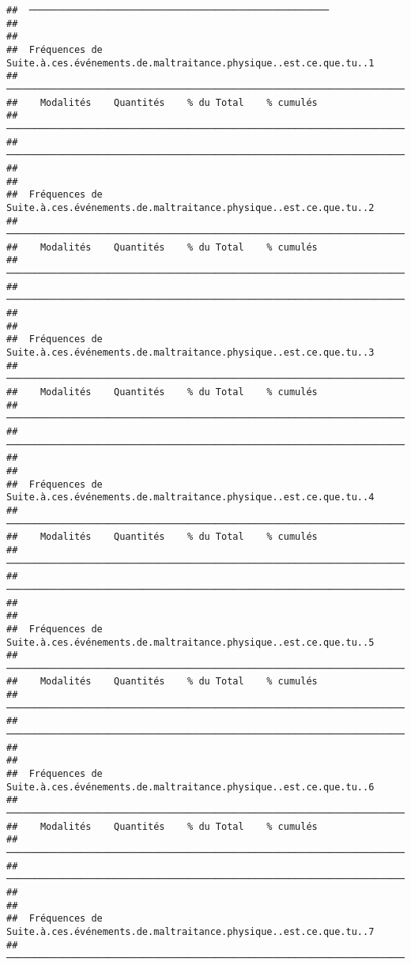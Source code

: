 \documentclass[
]{article}
\begin{document}
\begin{verbatim}
##  ───────────────────────────────────────────────────── 
## 
## 
##  Fréquences de Suite.à.ces.événements.de.maltraitance.physique..est.ce.que.tu..1 
##  ─────────────────────────────────────────────────────────────────────────────── 
##    Modalités    Quantités    % du Total    % cumulés   
##  ─────────────────────────────────────────────────────────────────────────────── 
##  ─────────────────────────────────────────────────────────────────────────────── 
## 
## 
##  Fréquences de Suite.à.ces.événements.de.maltraitance.physique..est.ce.que.tu..2 
##  ─────────────────────────────────────────────────────────────────────────────── 
##    Modalités    Quantités    % du Total    % cumulés   
##  ─────────────────────────────────────────────────────────────────────────────── 
##  ─────────────────────────────────────────────────────────────────────────────── 
## 
## 
##  Fréquences de Suite.à.ces.événements.de.maltraitance.physique..est.ce.que.tu..3 
##  ─────────────────────────────────────────────────────────────────────────────── 
##    Modalités    Quantités    % du Total    % cumulés   
##  ─────────────────────────────────────────────────────────────────────────────── 
##  ─────────────────────────────────────────────────────────────────────────────── 
## 
## 
##  Fréquences de Suite.à.ces.événements.de.maltraitance.physique..est.ce.que.tu..4 
##  ─────────────────────────────────────────────────────────────────────────────── 
##    Modalités    Quantités    % du Total    % cumulés   
##  ─────────────────────────────────────────────────────────────────────────────── 
##  ─────────────────────────────────────────────────────────────────────────────── 
## 
## 
##  Fréquences de Suite.à.ces.événements.de.maltraitance.physique..est.ce.que.tu..5 
##  ─────────────────────────────────────────────────────────────────────────────── 
##    Modalités    Quantités    % du Total    % cumulés   
##  ─────────────────────────────────────────────────────────────────────────────── 
##  ─────────────────────────────────────────────────────────────────────────────── 
## 
## 
##  Fréquences de Suite.à.ces.événements.de.maltraitance.physique..est.ce.que.tu..6 
##  ─────────────────────────────────────────────────────────────────────────────── 
##    Modalités    Quantités    % du Total    % cumulés   
##  ─────────────────────────────────────────────────────────────────────────────── 
##  ─────────────────────────────────────────────────────────────────────────────── 
## 
## 
##  Fréquences de Suite.à.ces.événements.de.maltraitance.physique..est.ce.que.tu..7 
##  ─────────────────────────────────────────────────────────────────────────────── 

\end{verbatim}
\end{document}
